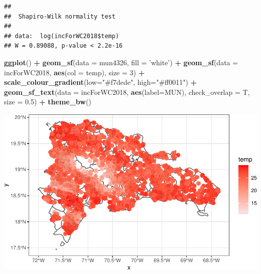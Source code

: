 \documentclass[11pt,]{article}
\newenvironment{Shaded}{\begin{snugshade}}{\end{snugshade}}
\newcommand{\KeywordTok}[1]{\textcolor[rgb]{0.13,0.29,0.53}{\textbf{#1}}}
\newcommand{\DataTypeTok}[1]{\textcolor[rgb]{0.13,0.29,0.53}{#1}}
\newcommand{\DecValTok}[1]{\textcolor[rgb]{0.00,0.00,0.81}{#1}}
\newcommand{\FloatTok}[1]{\textcolor[rgb]{0.00,0.00,0.81}{#1}}
\newcommand{\StringTok}[1]{\textcolor[rgb]{0.31,0.60,0.02}{#1}}
\newcommand{\CommentTok}[1]{\textcolor[rgb]{0.56,0.35,0.01}{\textit{#1}}}
\newcommand{\OperatorTok}[1]{\textcolor[rgb]{0.81,0.36,0.00}{\textbf{#1}}}
\newcommand{\NormalTok}[1]{#1}
\begin{document}
\begin{verbatim}
## 
##  Shapiro-Wilk normality test
## 
## data:  log(incForWC2018$temp)
## W = 0.89088, p-value < 2.2e-16
\end{verbatim}

\begin{Shaded}
\begin{Highlighting}[]
\KeywordTok{ggplot}\NormalTok{() }\OperatorTok{+}
\StringTok{  }\KeywordTok{geom_sf}\NormalTok{(}\DataTypeTok{data =}\NormalTok{ mun4326, }\DataTypeTok{fill =} \StringTok{'white'}\NormalTok{) }\OperatorTok{+}
\StringTok{  }\KeywordTok{geom_sf}\NormalTok{(}\DataTypeTok{data =}\NormalTok{ incForWC2018, }\KeywordTok{aes}\NormalTok{(}\DataTypeTok{col =}\NormalTok{ temp), }\DataTypeTok{size =} \DecValTok{3}\NormalTok{) }\OperatorTok{+}
\StringTok{  }\KeywordTok{scale_colour_gradient}\NormalTok{(}\DataTypeTok{low=}\StringTok{"#f7dede"}\NormalTok{, }\DataTypeTok{high=}\StringTok{"#ff0011"}\NormalTok{) }\OperatorTok{+}
\StringTok{  }\KeywordTok{geom_sf_text}\NormalTok{(}\DataTypeTok{data =}\NormalTok{ incForWC2018, }\KeywordTok{aes}\NormalTok{(}\DataTypeTok{label=}\NormalTok{MUN), }
               \DataTypeTok{check_overlap =}\NormalTok{ T, }\DataTypeTok{size =} \FloatTok{0.5}\NormalTok{) }\OperatorTok{+}
\StringTok{  }\KeywordTok{theme_bw}\NormalTok{()}
\end{Highlighting}
\end{Shaded}

\includegraphics{proyecto_files/figure-latex/unnamed-chunk-36-2.pdf}

\begin{Shaded}
\end{Shaded}
\end{document}

